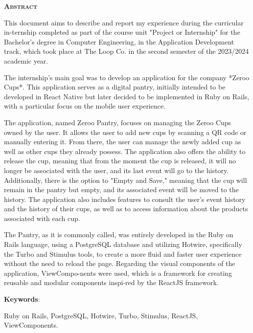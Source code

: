 
\vspace*{45pt}
\begin{flushleft}
	{\Large \textbf{\scshape{Abstract}}}
\end{flushleft}
\vspace*{10pt}


This document aims to describe and report my experience during the curricular in-ternship completed as part of the course unit 
"Project or Internship" for the Bachelor's degree in Computer Engineering, in the Application Development track, which took place 
at The Loop Co. in the second semester of the 2023/2024 academic year.

The internship's main goal was to develop an application for the company *Zeroo Cups*. This application serves as a digital pantry, initially intended to be developed in React Native but later decided to be implemented in Ruby on Rails, with a particular focus on the mobile user experience.

The application, named Zeroo Pantry, focuses on managing the Zeroo Cups owned by the user. It allows the user to add new cups by scanning a QR code or manually entering it. From there, the user can manage the newly added cup as well as other cups they already possess. The application also offers the ability to release the cup, meaning that from the moment the cup is released, it will no longer be associated with the user, and its last event will go to the history. Additionally, there is the option to "Empty and Save," meaning that the cup will remain in the pantry but empty, and its associated event will be moved to the history. The application also includes features to consult the user's event history and the history of their cups, as well as to access information about the products associated with each cup.

The Pantry, as it is commonly called, was entirely developed in the Ruby on Rails language, using a PostgreSQL database and utilizing Hotwire, specifically the Turbo and Stimulus tools, to create a more fluid and faster user experience without the need to reload the page. Regarding the visual components of the application, ViewCompo-nents were used, which is a framework for creating reusable and modular components inspi-red by the ReactJS framework.


\vspace*{20pt}

\noindent \textbf{Keywords}:

Ruby on Rails, PostgreSQL, Hotwire, Turbo, Stimulus, ReactJS, ViewComponents.

